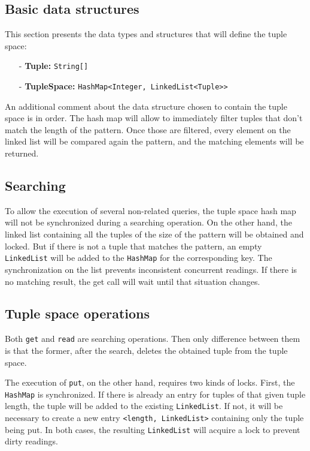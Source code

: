 \documentclass[paper=a4, fontsize=11pt]{scrartcl} %
\begin{document}
\subsection{Basic data structures}

This section presents the data types and structures that will define the tuple space:

\begin{itemize}
	\item[-] \textbf{Tuple:} \verb|String[]|
	\item[-] \textbf{TupleSpace:} \verb|HashMap<Integer, LinkedList<Tuple>>|
\end{itemize}

An additional comment about the data structure chosen to contain the tuple space is in order. The hash map will allow to immediately filter tuples that don't match the length of the pattern. Once those are filtered, every element on the linked list will be compared again the pattern, and the matching elements will be returned.

\subsection{Searching}

To allow the execution of several non-related queries, the tuple space hash map will not be synchronized during a searching operation. On the other hand, the linked list containing all the tuples of the size of the pattern will be obtained and locked. But if there is not a tuple that matches the pattern, an empty \verb|LinkedList| will be added to the \verb|HashMap| for the corresponding key. The synchronization on the list prevents inconsistent concurrent readings. If there is no matching result, the get call will wait until that situation changes.


\subsection{Tuple space operations}

Both \verb|get| and \verb|read| are searching operations. Then only difference between them is that the former, after the search, deletes the obtained tuple from the tuple space.

The execution of \verb|put|, on the other hand, requires two kinds of locks. First, the \verb|HashMap| is synchronized. If there is already an entry for tuples of that given tuple length, the tuple will be added to the existing \verb|LinkedList|. If not, it will be necessary to create a new entry \verb|<length, LinkedList>| containing only the tuple being put. In both cases, the resulting \verb|LinkedList| will acquire a lock to prevent dirty readings.
\end{document}
